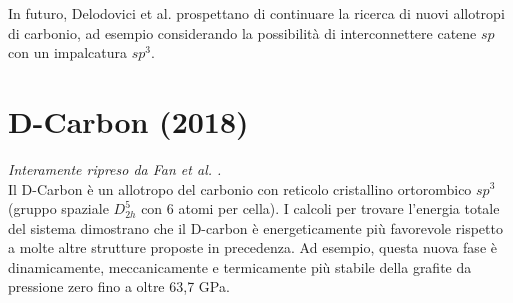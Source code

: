 \documentclass[a4paper,titlepage]{book}
\begin{document}
In futuro, Delodovici et al. prospettano di continuare la ricerca di nuovi allotropi di carbonio, ad esempio considerando la possibilità di interconnettere catene $sp$ con un impalcatura $sp^3$.


\chapter{D-Carbon (2018)}
\textit{Interamente ripreso da Fan et al. \cite{DCAR}.} \\

Il D-Carbon è un allotropo del carbonio con reticolo cristallino ortorombico $sp^3$ (gruppo spaziale $D_{2h}^5$ con 6 atomi per cella). I calcoli per trovare l'energia totale del sistema dimostrano che il D-carbon è energeticamente più favorevole rispetto a molte altre strutture proposte in precedenza. Ad esempio, questa nuova fase è dinamicamente, meccanicamente e termicamente più stabile della grafite da pressione zero fino a oltre 63,7 GPa.
\end{document}
